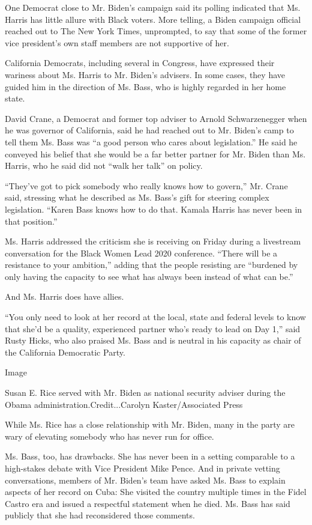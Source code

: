 One Democrat close to Mr. Biden's campaign said its polling indicated
that Ms. Harris has little allure with Black voters. More telling, a
Biden campaign official reached out to The New York Times, unprompted,
to say that some of the former vice president's own staff members are
not supportive of her.

California Democrats, including several in Congress, have expressed
their wariness about Ms. Harris to Mr. Biden's advisers. In some cases,
they have guided him in the direction of Ms. Bass, who is highly
regarded in her home state.

David Crane, a Democrat and former top adviser to Arnold Schwarzenegger
when he was governor of California, said he had reached out to Mr.
Biden's camp to tell them Ms. Bass was ``a good person who cares about
legislation.'' He said he conveyed his belief that she would be a far
better partner for Mr. Biden than Ms. Harris, who he said did not ``walk
her talk'' on policy.

``They've got to pick somebody who really knows how to govern,'' Mr.
Crane said, stressing what he described as Ms. Bass's gift for steering
complex legislation. ``Karen Bass knows how to do that. Kamala Harris
has never been in that position.''

Ms. Harris addressed the criticism she is receiving on Friday during a
livestream conversation for the Black Women Lead 2020 conference.
``There will be a resistance to your ambition,'' adding that the people
resisting are ``burdened by only having the capacity to see what has
always been instead of what can be.''

And Ms. Harris does have allies.

``You only need to look at her record at the local, state and federal
levels to know that she'd be a quality, experienced partner who's ready
to lead on Day 1,'' said Rusty Hicks, who also praised Ms. Bass and is
neutral in his capacity as chair of the California Democratic Party.

Image

Susan E. Rice served with Mr. Biden as national security adviser during
the Obama administration.Credit...Carolyn Kaster/Associated Press

While Ms. Rice has a close relationship with Mr. Biden, many in the
party are wary of elevating somebody who has never run for office.

Ms. Bass, too, has drawbacks. She has never been in a setting comparable
to a high-stakes debate with Vice President Mike Pence. And in private
vetting conversations, members of Mr. Biden's team have asked Ms. Bass
to explain aspects of her record on Cuba: She visited the country
multiple times in the Fidel Castro era and issued a respectful statement
when he died. Ms. Bass has said publicly that she had reconsidered those
comments.


